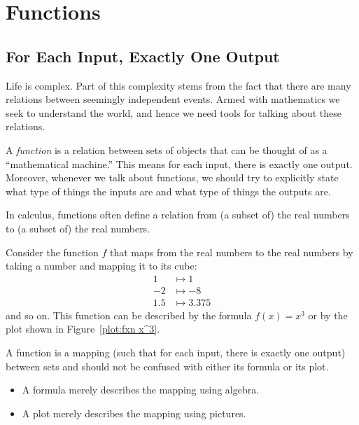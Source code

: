 \chapter{Functions}

\section{For Each Input, Exactly One Output}

Life is complex. Part of this complexity stems from the fact that
there are many relations between seemingly independent events. Armed
with mathematics we seek to understand the world, and hence we need
tools for talking about these relations.


A \textit{function} is a relation between sets of objects that can be
thought of as a ``mathematical machine.'' This means for each input,
there is exactly one output. Moreover, whenever we talk about
functions, we should try to explicitly state what type of things the
inputs are and what type of things the outputs are.

In calculus, functions often define a relation from (a subset of) the
real numbers to (a subset of) the real numbers.


\begin{example}
Consider the function $f$ that maps from the real numbers to the real
numbers by taking a number and mapping it to its cube:
\begin{align*}
1 &\mapsto 1\\
-2 &\mapsto -8\\
1.5 &\mapsto 3.375
\end{align*}
and so on. This function can be described by the formula $f(x)=x^3$ or
by the plot shown in Figure~\ref{plot:fxn x^3}.
\end{example}

\begin{warning}
A function is a mapping (such that for each input, there is exactly one
output) between sets and should not be confused with either its
formula or its plot.
\begin{itemize}
\item A formula merely describes the mapping using algebra.
\item A plot merely describes the mapping using pictures. 
\end{itemize}
\end{warning}


